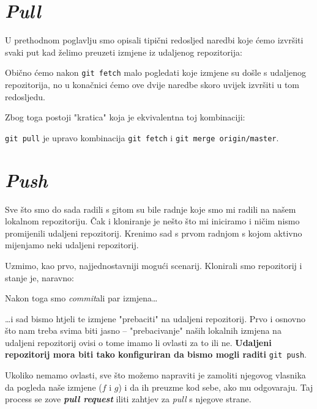 

\section*{\emph{Pull}}

U prethodnom poglavlju smo opisali tipični redosljed naredbi koje ćemo izvršiti svaki put kad želimo preuzeti izmjene iz udaljenog repozitorija:


Obično ćemo nakon \verb+git fetch+ malo pogledati koje izmjene su došle s udaljenog repozitorija, no u konačnici ćemo ove dvije naredbe skoro uvijek izvršiti u tom redosljedu.

Zbog toga postoji "kratica" koja je ekvivalentna toj kombinaciji:


\verb+git pull+ je upravo kombinacija \verb+git fetch+ i \verb+git merge origin/master+.

\section*{\emph{Push}}

Sve što smo do sada radili s gitom su bile radnje koje smo mi radili na našem lokalnom repozitoriju.
Čak i kloniranje je nešto što mi iniciramo i ničim nismo promijenili udaljeni repozitorij.
Krenimo sad s prvom radnjom s kojom aktivno mijenjamo neki udaljeni repozitorij.

Uzmimo, kao prvo, najjednostavniji mogući scenarij.
Klonirali smo repozitorij i stanje je, naravno:



Nakon toga smo \emph{commit}ali par izmjena\dots



\dots{}i sad bismo htjeli te izmjene "prebaciti" na udaljeni repozitorij.
Prvo i osnovno što nam treba svima biti jasno -- "prebacivanje" naših lokalnih izmjena na udaljeni repozitorij ovisi o tome imamo li ovlasti za to ili ne.
\textbf{Udaljeni repozitorij mora biti tako konfiguriran da bismo mogli raditi} \verb+git push+.

Ukoliko nemamo ovlasti, sve što možemo napraviti je zamoliti njegovog vlasnika da pogleda naše izmjene ($f$ i $g$) i da ih preuzme kod sebe, ako mu odgovaraju.
Taj process se zove \textbf{\emph{pull request}} iliti zahtjev za \emph{pull} s njegove strane.

